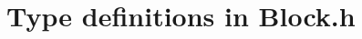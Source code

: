 \hypertarget{group___block___t_y_p_e_d_e_f_s}{}\section{Type definitions in Block.\+h}
\label{group___block___t_y_p_e_d_e_f_s}
